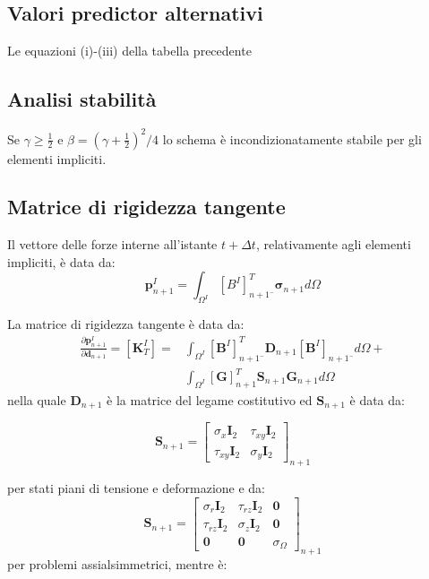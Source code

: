 \subsection{Valori predictor alternativi}
Le equazioni (i)-(iii) della tabella precedente

\subsection{Analisi stabilità}
Se $\gamma \geq \frac{1}{2}$ e $\beta=(\gamma + \frac{1}{2})^2/4$ lo schema è incondizionatamente stabile per gli elementi impliciti. 

\subsection{Matrice di rigidezza tangente}
Il vettore delle forze interne all'istante $t + \varDelta t$, relativamente agli elementi impliciti, è data da:
\begin{equation}
	\boldsymbol{p}_{n+1}^I = \int_{\varOmega^I}[B^I]_{n+1¯}^T\boldsymbol{\sigma}_{n+1}d\varOmega
\end{equation}

La matrice di rigidezza tangente è data da:
\begin{equation}
	\begin{split}
	\frac{\partial \boldsymbol{p}_{n+1}^I}{\partial \boldsymbol{d}_{n+1}} = [\boldsymbol{K}_T^I] = & 
	 \int_{\varOmega^I}[\boldsymbol{B}^I]_{n+1¯}^T\boldsymbol{D}_{n+1} [\boldsymbol{B}^I]_{n+1¯} d\varOmega + \\ 
	 & \int_{\varOmega^I} [\boldsymbol{G}]_{n+1}^T \boldsymbol{S}_{n+1} \boldsymbol{G}_{n+1} d\varOmega
 	\end{split}
\end{equation}
nella quale $\boldsymbol{D}_{n+1}$ è la matrice del legame costitutivo ed $\boldsymbol{S}_{n+1}$ è data da:

\begin{equation}
	\boldsymbol{S}_{n+1} = 
	\begin{bmatrix}
	    \sigma_x \mathbf{I}_2  & \tau_{xy} \mathbf{I}_2	\\
	    \tau_{xy} \mathbf{I}_2 & \sigma_y  \mathbf{I}_2                
	\end{bmatrix}_{n+1}
\end{equation}

per stati piani di tensione e deformazione e da:
\begin{equation}
	\boldsymbol{S}_{n+1} = 
	\begin{bmatrix}
		\sigma_r \mathbf{I}_2  & \tau_{rz} \mathbf{I}_2	& \mathbf{0} \\
		\tau_{rz} \mathbf{I}_2 & \sigma_z  \mathbf{I}_2	& \mathbf{0} \\
		\mathbf{0}             & \mathbf{0}             & \sigma_\Omega                
	\end{bmatrix}_{n+1}
\end{equation}
per problemi assialsimmetrici, mentre è:

